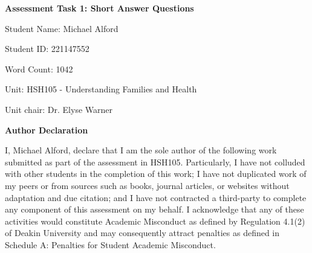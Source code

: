 \begin{titlepage}
  \begin{center}
    \textbf{Assessment Task 1: Short Answer Questions}
    
    \vspace{1.0cm}
    
    Student Name: Michael Alford
    
    \vspace{1.0cm}
    
    Student ID: 221147552
    
    \vspace{1.0cm}
    
    Word Count: 1042
    
    \vspace{1.0cm}
    
    Unit: HSH105 - Understanding Families and Health
    
    \vspace{1.0cm}
    
    Unit chair: Dr. Elyse Warner

    \vfill

    \textbf{Author Declaration}

    I, Michael Alford, declare that I am the sole author of the following work submitted as part of the assessment  in  HSH105.  Particularly,  I  have  not  colluded  with  other  students  in  the  completion  of this work; I have not duplicated work     of my peers or from sources such as books, journal articles, or websites  without  adaptation  and  due  citation;  and  I  have  not  contracted  a  third-party  to  complete any  component  of  this  assessment  on  my  behalf.  I  acknowledge that any  of  these  activities  would constitute  Academic  Misconduct  as  defined  by  Regulation  4.1(2)  of  Deakin  University  and  may consequently attract penalties as defined in Schedule A: Penalties for Student Academic Misconduct.
    
  \end{center}
\end{titlepage}